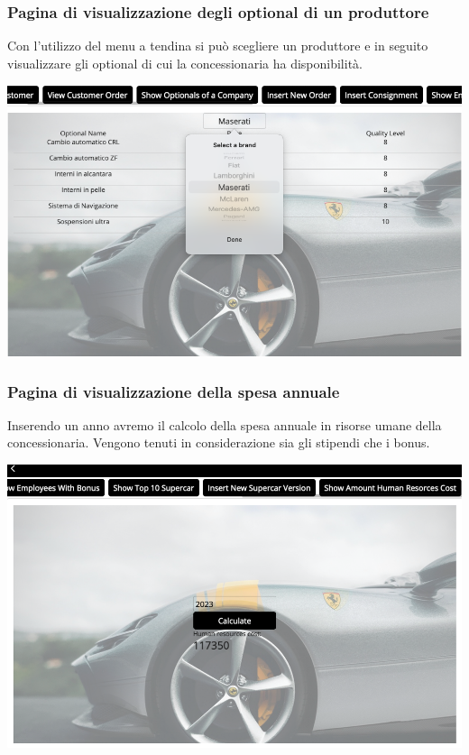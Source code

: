 \documentclass[11pt]{article}
\begin{document}
\subsubsection{Pagina di visualizzazione degli optional di un produttore}
Con l'utilizzo del menu a tendina si può scegliere un produttore e in seguito
visualizzare gli optional di cui la concessionaria ha disponibilità.

\begin{center}
    \includegraphics[width=\linewidth]{images/app/brandOptional.png}
\end{center}

\subsubsection{Pagina di visualizzazione della spesa annuale}
Inserendo un anno avremo il calcolo della spesa annuale in risorse umane della
concessionaria.
Vengono tenuti in considerazione sia gli stipendi che i bonus.

\begin{center}
    \includegraphics[width=\linewidth]{images/app/humanResourcesCost.png}
\end{center}
\end{document}
